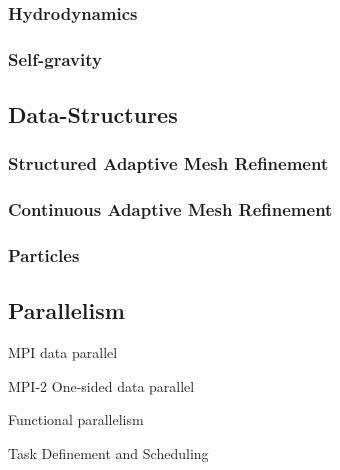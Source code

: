 \documentclass{article}
\begin{document}
\subsubsection{Hydrodynamics}

\subsubsection{Self-gravity}

\subsection{Data-Structures}

\subsubsection{Structured Adaptive Mesh Refinement}

\subsubsection{Continuous Adaptive Mesh Refinement}

\subsubsection{Particles}



\subsection{Parallelism}

MPI data parallel

MPI-2 One-sided data parallel

Functional parallelism

Task Definement and Scheduling
\end{document}
